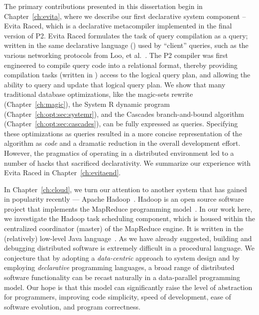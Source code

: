 The primary contributions presented in this dissertation begin in
Chapter~\ref{ch:evita}, where we describe our first declarative system
component -- Evita Raced, which is a declarative metacompiler implemented in
the final version of P2.  Evita Raced formulates the task of query compilation
as a query; written in the same declarative language (\OVERLOG) used by
``client'' queries, such as the various networking protocols from Loo, et
al.~\cite{loo-sigmod06, p2:sosp}.  The P2 compiler was first engineered to
compile query code into a relational format, thereby providing compilation
tasks (written in \OVERLOG) access to the logical query plan, and allowing the
ability to query and update that logical query plan.  We show that many
traditional database optimizations, like the magic-sets rewrite
(Chapter~\ref{ch:magic}), the System R dynamic program
(Chapter~\ref{ch:opt:sec:systemr}), and the Cascades branch-and-bound algorithm
(Chapter~\ref{ch:opt:sec:cascades}), can be fully expressed as \OVERLOG
queries.  Specifying these optimizations as \OVERLOG queries resulted in a more
concise representation of the algorithm as {\em code} and a dramatic reduction
in the overall development effort.  However, the pragmatics of operating in a
distributed environment led to a number of hacks that sacrificed declarativity.
We summarize our experience with Evita Raced in Chapter~\ref{ch:evitaend}.
 
In Chapter~\ref{ch:cloud}, we turn our attention to another system that has
gained in popularity recently --- Apache Hadoop~\cite{hadoop}.  Hadoop is an
open source software project that implements the MapReduce programming
model~\cite{mapreduce-osdi}.  In our work here, we investigate the Hadoop task
scheduling component, which is housed within the centralized coordinator
(master) of the MapReduce engine.  It is written in the (relatively) low-level
Java language~\cite{java}.  As we have already suggested, building and
debugging distributed software is extremely difficult in a procedural language.
We conjecture that by adopting a {\em data-centric} approach to system design
and by employing {\em declarative} programming languages, a broad range of
distributed software functionality can be recast naturally in a data-parallel
programming model.  Our hope is that this model can significantly raise the
level of abstraction for programmers, improving code simplicity, speed of
development, ease of software evolution, and program correctness.

